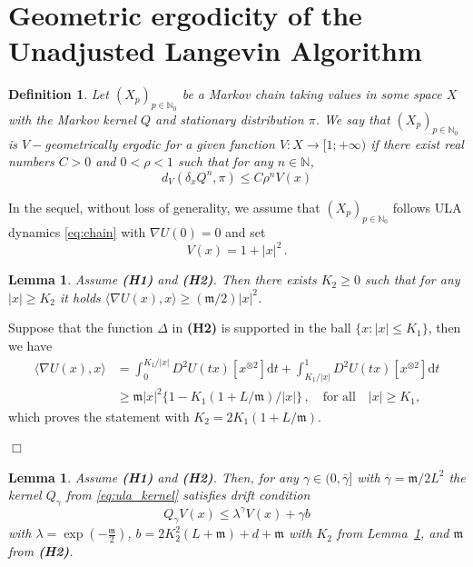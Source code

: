 \documentclass[bj]{imsart}
\newcommand{\ps}[2]{\langle #1, #2 \rangle}
\def\nset{\mathbb{N}}
\def\rmd{\mathrm{d}}
\newcommand{\proofendsign}{$\Box$}
\newtheorem{definition}{Definition}
\newtheorem{lem}[thm]{Lemma}
\newenvironment{proof}{{\noindent \bf Proof }}
 {{\hspace*{\fill}\proofendsign\par\bigskip}}
\def\eqsp{\,}
\begin{document}
\appendix
\section{Geometric ergodicity of the Unadjusted Langevin Algorithm}\label{sec:appendix}


\begin{definition}
\label{def:v_ergodicity}
Let $(X_p)_{p \in \nset_0}$ be a Markov chain taking values in some space $X$ with the Markov kernel $Q$ and stationary distribution $\pi$. We say that $(X_p)_{p \in \nset_0}$ is $V-$geometrically ergodic for a given function $V: X \rightarrow [1; +\infty)$ if there exist real numbers $C > 0$ and $0 < \rho < 1$ such that for any $n \in \nset$,
\begin{equation}
\label{eq:v_ergodicity}
d_V(\delta_xQ^{n},\pi) \leq C\rho^n V(x)
\end{equation}
\end{definition}
In  the sequel, without loss of generality, we assume that $(X_p)_{p \in \nset_0}$ follows ULA dynamics \eqref{eq:chain} with $\nabla U(0)=0$ and  set
\begin{equation}
\label{eq:definition-V}
V(x) = 1 + |x|^2 \eqsp.
\end{equation}
\begin{lem}
  \label{lem:quadratic_behaviour}
  Assume {\bf (H1)} and {\bf (H2)}. Then there exists $K_2 \geq 0$ such that for any $ | x | \geq K_2$ it holds $\ps{\nabla U(x)}{x} \geq (\mathfrak{m}/2) | x |^2$.
\end{lem}
\begin{proof}
 Suppose that the function $\Delta$ in {\bf (H2)} is supported in the ball $\{x:|x|\leq K_1\}$, then we have 
  \begin{align*}
    \ps{\nabla U(x)}{x}
    &= \int_{0}^{K_1/| x |} D^2 U(t x ) [x^{\otimes 2}] \rmd t + \int_{K_1/| x |} ^ 1 D^2 U(t x ) [x^{\otimes 2}] \rmd t\\
    & \geq \mathfrak{m} |x |^2 \{1- K_1 (1 +L/\mathfrak{m})   / | x | \}\eqsp,\quad \mbox{for all} \quad  | x |\geq K_1,
  \end{align*}
which proves the  statement with $K_2=2K_{1}(1+L/\mathfrak{m}).$
\end{proof}
\begin{lem}
\label{lem:drift}
 Assume {\bf (H1)} and {\bf (H2)}.
 Then, for any $\gamma \in (0,\bar{\gamma}]$ with $\overline{\gamma} = \mathfrak{m}/2L^2$  the kernel $Q_\gamma$ from \eqref{eq:ula_kernel} satisfies drift condition
 \begin{equation}
\label{eq:lyapunov}
Q_{\gamma}V(x) \leq \lambda^{\gamma} V(x) + \gamma b
\end{equation}
with   $\lambda = \exp{\left(-\frac{\mathfrak{m}}{2}\right)}$, $b = 2K_2^2(L+\mathfrak{m}) + d + \mathfrak{m}$ with $K_2$ from Lemma~\ref{lem:quadratic_behaviour}, and $\mathfrak{m}$ from {\bf (H2)}.
\end{lem}
\end{document}
